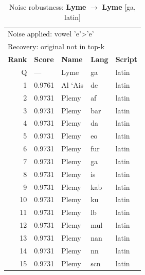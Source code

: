 \begin{table}[htbp]
\centering
\small
\caption{Noise robustness: \textbf{Lyme} $\rightarrow$ \textbf{Lyme} [ga, latin]}
\label{tab:noise-9}
\begin{tabular}{rllll}
\toprule
\multicolumn{5}{l}{\small Noise applied: vowel 'e'>'e'} \\
\multicolumn{5}{l}{\small Recovery: original not in top-k} \\
\midrule
\textbf{Rank} & \textbf{Score} & \textbf{Name} & \textbf{Lang} & \textbf{Script} \\
\midrule
\rowcolor{gray!20} Q & --- & Lyme & ga & latin \\
\midrule
1 & 0.9761 & Al `Ais & de & latin \\
2 & 0.9731 & Plemy & af & latin \\
3 & 0.9731 & Plemy & bar & latin \\
4 & 0.9731 & Plemy & da & latin \\
5 & 0.9731 & Plemy & eo & latin \\
6 & 0.9731 & Plemy & fur & latin \\
7 & 0.9731 & Plemy & ga & latin \\
8 & 0.9731 & Plemy & is & latin \\
9 & 0.9731 & Plemy & kab & latin \\
10 & 0.9731 & Plemy & ku & latin \\
11 & 0.9731 & Plemy & lb & latin \\
12 & 0.9731 & Plemy & mul & latin \\
13 & 0.9731 & Plemy & nan & latin \\
14 & 0.9731 & Plemy & nn & latin \\
15 & 0.9731 & Plemy & scn & latin \\
\bottomrule
\end{tabular}
\end{table}

